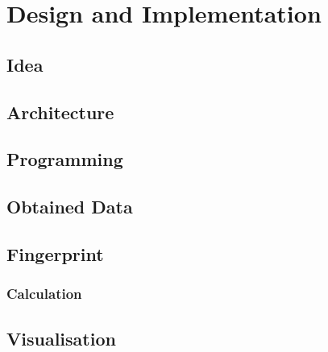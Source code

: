 \chapter{Design and Implementation}
\label{cha:implementation}

\section{Idea}

\section{Architecture}

\section{Programming}


\section{Obtained Data}


\section{Fingerprint}

\subsection{Calculation}

\section{Visualisation}